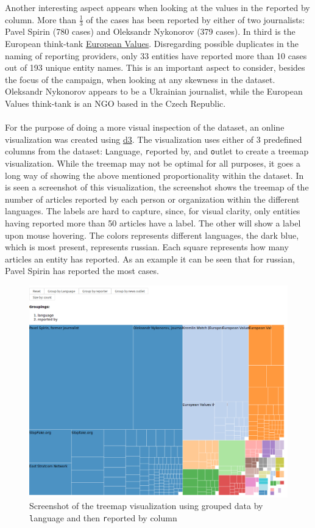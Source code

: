 \documentclass{article}
\begin{document}
Another interesting aspect appears when looking at the values in the {\texttt reported by} column. More than $\frac{1}{3}$ of the cases has been reported by either of two journalists: Pavel Spirin (780 cases) and Oleksandr Nykonorov (379 cases). In third is the European think-tank \href{http://europeanvalues.net/kremlinwatch}{European Values}. Disregarding possible duplicates in the naming of reporting providers, only 33 entities have reported more than 10 cases out of 193 unique entity names. This is an important aspect to consider, besides the focus of the campaign, when looking at any skewness in the dataset. Oleksandr Nykonorov appears to be a Ukrainian journalist, while the European Values think-tank is an NGO based in the Czech Republic.
\\\\
For the purpose of doing a more visual inspection of the dataset, an online visualization was created using \href{https://d3js.org}{d3}. The visualization uses either of 3 predefined columns from the dataset: {\texttt Language}, {\texttt reported by}, and {\texttt outlet} to create a treemap visualization. While the treemap may not be optimal for all purposes, it goes a long way of showing the above mentioned proportionality within the dataset. In  is seen a screenshot of this visualization, the screenshot shows the treemap of the number of articles reported by each person or organization within the different languages. The labels are hard to capture, since, for visual clarity, only entities having reported more than 50 articles have a label. The other will show a label upon mouse hovering. The colors represents different languages, the dark blue, which is most present, represents russian. Each square represents how many articles an entity has reported. As an example it can be seen that for russian, Pavel Spirin has reported the most cases. 

\begin{figure}[H]
\caption{Screenshot of the treemap visualization using grouped data by {\texttt language} and then {\texttt reported by} column}
\label{fig:viz4kidz}
\includegraphics[width=\textwidth]{images/reportedBy_perLanguage_sizeByCount.png}
\end{figure}
\end{document}

